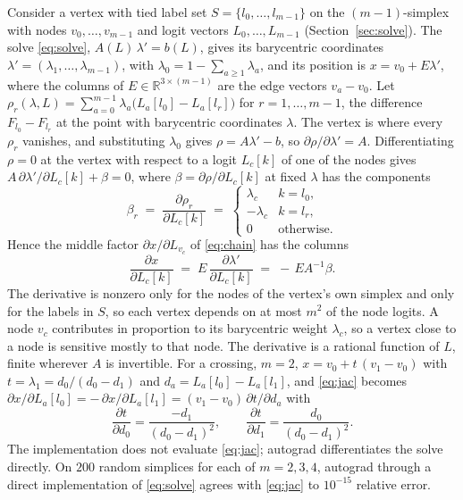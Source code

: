 \documentclass[11pt]{article}
\theoremstyle{definition}
\newcommand{\interp}{F}
\begin{document}
Consider a vertex with tied label set $S = \{l_0,\dots,l_{m-1}\}$ on the
$(m-1)$-simplex with nodes $v_0,\dots,v_{m-1}$ and logit vectors
$L_0,\dots,L_{m-1}$ (Section~\ref{sec:solve}). The solve \eqref{eq:solve},
$A(L)\,\lambda' = b(L)$, gives its barycentric coordinates
$\lambda' = (\lambda_1,\dots,\lambda_{m-1})$, with
$\lambda_0 = 1 - \sum_{a\ge1}\lambda_a$, and its position is
$x = v_0 + E\lambda'$, where the columns of $E \in \mathbb{R}^{3\times(m-1)}$
are the edge vectors $v_a - v_0$. Let
$\rho_r(\lambda, L) = \sum_{a=0}^{m-1} \lambda_a \big(L_a[l_0] - L_a[l_r]\big)$
for $r = 1,\dots,m-1$, the difference $\interp_{l_0} - \interp_{l_r}$ at the
point with barycentric coordinates $\lambda$. The vertex is where every
$\rho_r$ vanishes, and substituting $\lambda_0$ gives $\rho = A\lambda' - b$,
so $\partial\rho/\partial\lambda' = A$. Differentiating $\rho = 0$ at the
vertex with respect to a logit $L_c[k]$ of one of the nodes gives
$A\,\partial\lambda'/\partial L_c[k] + \beta = 0$, where
$\beta = \partial \rho/\partial L_c[k]$ at fixed $\lambda$ has the components
\begin{equation}
  \beta_r \;=\; \frac{\partial \rho_r}{\partial L_c[k]}
       \;=\; \begin{cases} \lambda_c & k = l_0,\\ -\lambda_c & k = l_r,\\ 0 & \text{otherwise}. \end{cases}
  \label{eq:w}
\end{equation}
Hence the middle factor $\partial x/\partial L_{v_c}$ of \eqref{eq:chain} has
the columns
\begin{equation}
  \frac{\partial x}{\partial L_c[k]}
  \;=\; E\,\frac{\partial \lambda'}{\partial L_c[k]}
  \;=\; -\,E A^{-1} \beta .
  \label{eq:jac}
\end{equation}
The derivative is nonzero only for the
nodes of the vertex's own simplex and only for the labels in $S$, so each
vertex depends on at most $m^2$ of the node logits. A node $v_c$ contributes
in proportion to its barycentric weight $\lambda_c$, so a vertex close to a
node is sensitive mostly to that node. The derivative is a rational
function of $L$, finite wherever $A$ is invertible. For a crossing, $m=2$,
$x = v_0 + t\,(v_1 - v_0)$ with $t = \lambda_1 = d_0/(d_0 - d_1)$ and
$d_a = L_a[l_0] - L_a[l_1]$, and \eqref{eq:jac} becomes
$\partial x/\partial L_a[l_0] = -\,\partial x/\partial L_a[l_1]
= (v_1 - v_0)\,\partial t/\partial d_a$ with
\begin{equation}
  \frac{\partial t}{\partial d_0} = \frac{-d_1}{(d_0-d_1)^2}, \qquad
  \frac{\partial t}{\partial d_1} = \frac{d_0}{(d_0-d_1)^2}.
  \label{eq:jac2}
\end{equation}
The implementation does not evaluate \eqref{eq:jac}; autograd differentiates
the solve directly. On $200$ random simplices for each of $m = 2, 3, 4$,
autograd through a direct implementation of \eqref{eq:solve} agrees with
\eqref{eq:jac} to $10^{-15}$ relative error.
\end{document}
